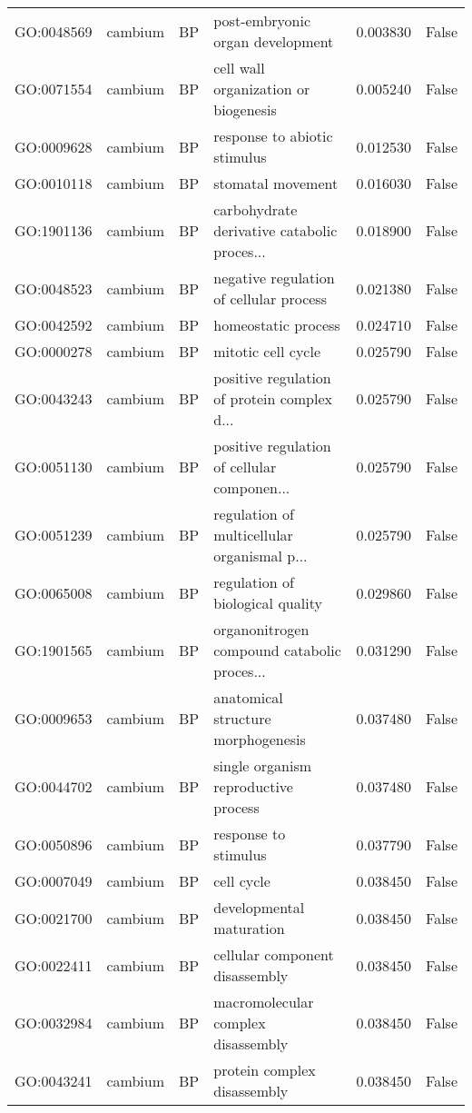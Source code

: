 \begin{longtable}{llllrl}
GO:0048569 & cambium & BP &   post-embryonic organ development  & 0.003830 &   False \\
GO:0071554 & cambium & BP &   cell wall organization or biogenesis  & 0.005240 &   False \\
GO:0009628 & cambium & BP &   response to abiotic stimulus  & 0.012530 &   False \\
GO:0010118 & cambium & BP &   stomatal movement  & 0.016030 &   False \\
GO:1901136 & cambium & BP &   carbohydrate derivative catabolic proces...  & 0.018900 &   False \\
GO:0048523 & cambium & BP &   negative regulation of cellular process  & 0.021380 &   False \\
GO:0042592 & cambium & BP &   homeostatic process  & 0.024710 &   False \\
GO:0000278 & cambium & BP &   mitotic cell cycle  & 0.025790 &   False \\
GO:0043243 & cambium & BP &   positive regulation of protein complex d...  & 0.025790 &   False \\
GO:0051130 & cambium & BP &   positive regulation of cellular componen...  & 0.025790 &   False \\
GO:0051239 & cambium & BP &   regulation of multicellular organismal p...  & 0.025790 &   False \\
GO:0065008 & cambium & BP &   regulation of biological quality  & 0.029860 &   False \\
GO:1901565 & cambium & BP &   organonitrogen compound catabolic proces...  & 0.031290 &   False \\
GO:0009653 & cambium & BP &   anatomical structure morphogenesis  & 0.037480 &   False \\
GO:0044702 & cambium & BP &   single organism reproductive process  & 0.037480 &   False \\
GO:0050896 & cambium & BP &   response to stimulus  & 0.037790 &   False \\
GO:0007049 & cambium & BP &   cell cycle  & 0.038450 &   False \\
GO:0021700 & cambium & BP &   developmental maturation  & 0.038450 &   False \\
GO:0022411 & cambium & BP &   cellular component disassembly  & 0.038450 &   False \\
GO:0032984 & cambium & BP &   macromolecular complex disassembly  & 0.038450 &   False \\
GO:0043241 & cambium & BP &   protein complex disassembly  & 0.038450 &   False \\

\end{longtable}
